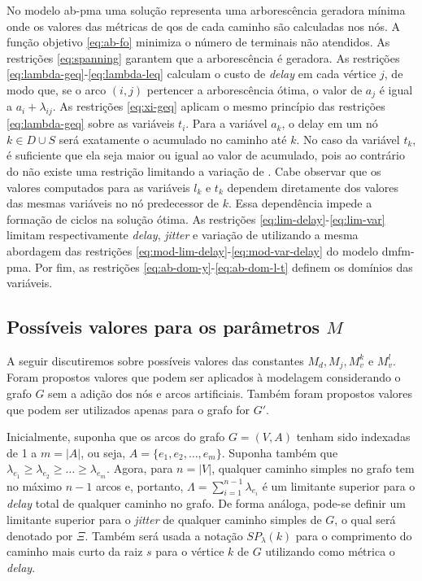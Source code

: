 No  modelo  \gls{ab-pma}  uma  solução  representa  uma  arborescência
geradora  mínima onde  os valores  das métricas  de \gls{qos}  de cada
caminho são  calculadas nos  nós.  A função  objetivo \eqref{eq:ab-fo}
minimiza  o   número  de  terminais  não   atendidos.   As  restrições
\eqref{eq:spanning}  garantem  que  a arborescência  é  geradora.   As
restrições   \eqref{eq:lambda-geq}-\eqref{eq:lambda-leq}  calculam   o
custo de  \textit{delay} em cada vértice  $j$, de modo que,  se o arco
$(i, j)$ pertencer  a arborescência ótima, o valor de  $a_j$ é igual a
$a_i + \lambda_{ij}$. As  restrições \eqref{eq:xi-geq} aplicam o mesmo
princípio  das  restrições  \eqref{eq:lambda-geq} sobre  as  variáveis
$t_i$. Para a variável  $a_k$, o delay em um nó $k \in  D \cup S$ será
exatamente  o  {\delay} acumulado  no  caminho  até  $k$. No  caso  da
variável $t_k$, é  suficiente que ela seja maior ou  igual ao valor de
{\jitter}  acumulado, pois  ao contrário  do {\delay}  não existe  uma
restrição  limitando a  variação de  {\jitter}. Cabe  observar que  os
valores  computados   para  as   variáveis  $l_k$  e   $t_k$  dependem
diretamente  dos valores  das mesmas  variáveis no  nó predecessor  de
$k$. Essa dependência impede a formação de ciclos na solução ótima. As
restrições       \eqref{eq:lim-delay}-\eqref{eq:lim-var}       limitam
respectivamente \textit{delay}, \textit{jitter} e variação de {\delay}
utilizando      a       mesma      abordagem       das      restrições
\eqref{eq:mod-lim-delay}-\eqref{eq:mod-var-delay}       do      modelo
\gls{dmfm-pma}.          Por         fim,        as         restrições
\eqref{eq:ab-dom-y}-\eqref{eq:ab-dom-l-t}  definem   os  domínios  das
variáveis.

\subsection{Possíveis valores para os parâmetros $M$} \label{subsec:m-param}

A  seguir discutiremos  sobre possíveis  valores das  constantes $M_d,
M_j, M^k_v$ e $M^l_v$. Foram propostos valores que podem ser aplicados
à modelagem  considerando o  grafo $G$  sem a adição  dos nós  e arcos
artificiais.  Também foram propostos  valores que podem ser utilizados
apenas para o grafo for $G'$.

Inicialmente, suponha  que os  arcos do grafo  $G=(V, A)$  tenham sido
indexadas de  1 a $m  = |A|$,  ou seja, $A  = \{e_1,e_2,\ldots,e_m\}$.
Suponha também que $\lambda_{e_1}  \geq \lambda_{e_2} \geq \ldots \geq
\lambda_{e_m}$. Agora, para $n=|V|$, qualquer caminho simples no grafo
tem  no  máximo  $n-1$ arcos  e,  portanto,  $\Lambda=\sum_{i=1}^{n-1}
\lambda_{e_i}$ é um limitante superior  para o \textit{delay} total de
qualquer  caminho no  grafo.   De forma  análoga,  pode-se definir  um
limitante superior para o  \textit{jitter} de qualquer caminho simples
de $G$, o  qual será denotado por $\Xi$.  Também  será usada a notação
$SP_\lambda(k)$ para o  comprimento do caminho mais curto  da raiz $s$
para o vértice $k$ de $G$ utilizando como métrica o \textit{delay}.

